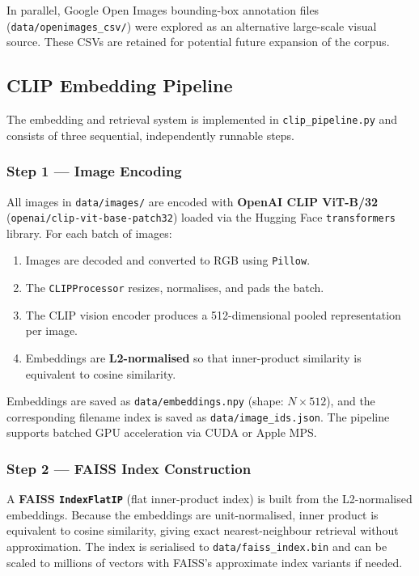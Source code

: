\documentclass[11pt,a4paper]{article}
\begin{document}
In parallel, Google Open Images bounding-box annotation files (\texttt{data/openimages\_csv/}) were explored as an alternative large-scale visual source. These CSVs are retained for potential future expansion of the corpus.

\subsection*{CLIP Embedding Pipeline}

The embedding and retrieval system is implemented in \texttt{clip\_pipeline.py} and consists of three sequential, independently runnable steps.

\subsubsection*{Step 1 — Image Encoding}

All images in \texttt{data/images/} are encoded with \textbf{OpenAI CLIP ViT-B/32} (\texttt{openai/clip-vit-base-patch32}) loaded via the Hugging Face \texttt{transformers} library. For each batch of images:
\begin{enumerate}
  \item Images are decoded and converted to RGB using \texttt{Pillow}.
  \item The \texttt{CLIPProcessor} resizes, normalises, and pads the batch.
  \item The CLIP vision encoder produces a 512-dimensional pooled representation per image.
  \item Embeddings are \textbf{L2-normalised} so that inner-product similarity is equivalent to cosine similarity.
\end{enumerate}
Embeddings are saved as \texttt{data/embeddings.npy} (shape: $N \times 512$), and the corresponding filename index is saved as \texttt{data/image\_ids.json}. The pipeline supports batched GPU acceleration via CUDA or Apple MPS.

\subsubsection*{Step 2 — FAISS Index Construction}

A \textbf{FAISS \texttt{IndexFlatIP}} (flat inner-product index) is built from the L2-normalised embeddings. Because the embeddings are unit-normalised, inner product is equivalent to cosine similarity, giving exact nearest-neighbour retrieval without approximation. The index is serialised to \texttt{data/faiss\_index.bin} and can be scaled to millions of vectors with FAISS's approximate index variants if needed.
\end{document}
